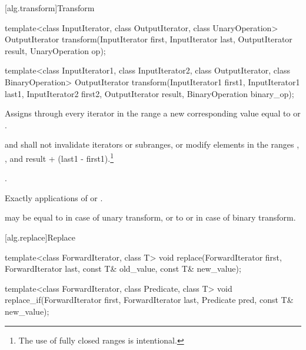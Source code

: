 [alg.transform]{Transform}

%
\begin{itemdecl}
template<class InputIterator, class OutputIterator,
         class UnaryOperation>
  OutputIterator
    transform(InputIterator first, InputIterator last,
              OutputIterator result, UnaryOperation op);

template<class InputIterator1, class InputIterator2,
         class OutputIterator, class BinaryOperation>
  OutputIterator
    transform(InputIterator1 first1, InputIterator1 last1,
              InputIterator2 first2, OutputIterator result,
              BinaryOperation binary_op);
\end{itemdecl}

\begin{itemdescr}
\pnum
\effects
Assigns through every iterator
in the range
a new
corresponding value equal to
or
.

\pnum
\requires
{} and 
shall not invalidate iterators or subranges, or modify elements in the ranges
,
,
and
{result + (last1 - first1)}.\footnote{The use of fully
closed ranges is intentional.}

\pnum
\returns
{}.

\pnum
\complexity
Exactly
applications of
 or .

\pnum
\notes
{} may be equal to 
in case of unary transform,
or to  or 
in case of binary transform.
\end{itemdescr}

[alg.replace]{Replace}

%
%
\begin{itemdecl}
template<class ForwardIterator, class T>
  void replace(ForwardIterator first, ForwardIterator last,
               const T& old_value, const T& new_value);

template<class ForwardIterator, class Predicate, class T>
  void replace_if(ForwardIterator first, ForwardIterator last,
                  Predicate pred, const T& new_value);
\end{itemdecl}

